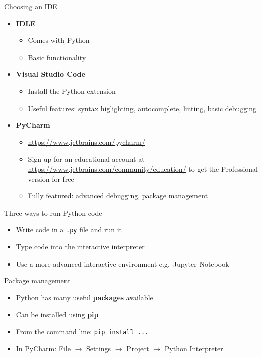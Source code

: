 \begin{frame}{Choosing an IDE}
    \begin{itemize}
        \pause\item \textbf{IDLE}
        \begin{itemize}
            \pause\item Comes with Python
            \pause\item Basic functionality
        \end{itemize}
        \pause\item \textbf{Visual Studio Code}
        \begin{itemize}
            \pause\item Install the Python extension
            \pause\item Useful features: syntax higlighting, autocomplete, linting, basic debugging
        \end{itemize}
        \pause\item \textbf{PyCharm}
        \begin{itemize}
            \pause\item \url{https://www.jetbrains.com/pycharm/}
            \pause\item Sign up for an educational account at \url{https://www.jetbrains.com/community/education/} to get the Professional version for free
            \pause\item Fully featured: advanced debugging, package management
        \end{itemize}
    \end{itemize}
\end{frame}

\begin{frame}{Three ways to run Python code}
    \begin{itemize}
        \pause\item Write code in a \texttt{.py} file and run it
        \pause\item Type code into the interactive interpreter
        \pause\item Use a more advanced interactive environment e.g.\ Jupyter Notebook
    \end{itemize}
\end{frame}

\begin{frame}{Package management}
    \begin{itemize}
        \pause\item Python has many useful \textbf{packages} available
        \pause\item Can be installed using \textbf{pip}
        \pause\item From the command line: \texttt{pip install ...}
        \pause\item In PyCharm: File $\to$ Settings $\to$ Project $\to$ Python Interpreter
    \end{itemize}
\end{frame}


